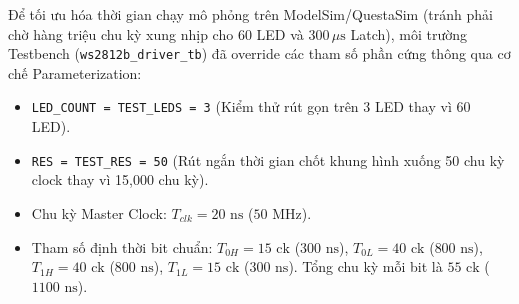 \documentclass[12pt,a4paper]{article}
\begin{document}
Để tối ưu hóa thời gian chạy mô phỏng trên ModelSim/QuestaSim (tránh phải chờ hàng triệu chu kỳ xung nhịp cho 60 LED và $300\,\mu\text{s}$ Latch), môi trường Testbench (\texttt{ws2812b\_driver\_tb}) đã override các tham số phần cứng thông qua cơ chế Parameterization:
\begin{itemize}
    \item \texttt{LED\_COUNT = TEST\_LEDS = 3} (Kiểm thử rút gọn trên 3 LED thay vì 60 LED).
    \item \texttt{RES = TEST\_RES = 50} (Rút ngắn thời gian chốt khung hình xuống 50 chu kỳ clock thay vì 15,000 chu kỳ).
    \item Chu kỳ Master Clock: $T_{clk} = 20\text{ ns}$ ($50\text{ MHz}$).
    \item Tham số định thời bit chuẩn: $T_{0H} = 15\text{ ck}$ ($300\text{ ns}$), $T_{0L} = 40\text{ ck}$ ($800\text{ ns}$), $T_{1H} = 40\text{ ck}$ ($800\text{ ns}$), $T_{1L} = 15\text{ ck}$ ($300\text{ ns}$). Tổng chu kỳ mỗi bit là $55\text{ ck}$ ($1100\text{ ns}$).
\end{itemize}
\end{document}
